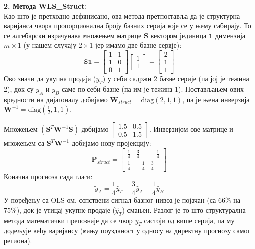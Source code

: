 \documentclass[12pt,oneside]{memoir}
\begin{document}
\vspace{0.5em}
\noindent \textbf{2. Метода WLS\_Struct:} \\
Као што је претходно дефинисано, ова метода претпоставља да је структурна варијанса чвора пропорционална броју базних серија које се у њему сабирају. То се алгебарски израчунава множењем матрице $\mathbf{S}$ вектором јединица $\mathbf{1}$ димензија $m \times 1$ (у нашем случају $2 \times 1$ јер имамо две базне серије):
\begin{equation}
    \mathbf{S}\mathbf{1} = 
    \begin{bmatrix} 1 & 1 \\ 1 & 0 \\ 0 & 1 \end{bmatrix} 
    \begin{bmatrix} 1 \\ 1 \end{bmatrix} = 
    \begin{bmatrix} 2 \\ 1 \\ 1 \end{bmatrix}
\end{equation}
Ово значи да укупна продаја ($y_T$) у себи садржи 2 базне серије (па јој је тежина 2), док су $y_A$ и $y_B$ саме по себи базне (па им је тежина 1). Постављањем ових вредности на дијагоналу добијамо $\mathbf{W}_{struct} = \text{diag}(2, 1, 1)$, па је њена инверзија $\mathbf{W}^{-1} = \text{diag}(\frac{1}{2}, 1, 1)$. 


Множењем $(\mathbf{S}^T \mathbf{W}^{-1} \mathbf{S})$ добијамо $\begin{bmatrix} 1.5 & 0.5 \\ 0.5 & 1.5 \end{bmatrix}$. Инверзијом ове матрице и множењем са $\mathbf{S}^T \mathbf{W}^{-1}$ добијамо нову пројекцију:
\begin{equation}
    \mathbf{P}_{struct} = 
    \begin{bmatrix} 
    \frac{1}{4} & \frac{3}{4} & -\frac{1}{4} \\ 
    \frac{1}{4} & -\frac{1}{4} & \frac{3}{4} 
    \end{bmatrix}
\end{equation}
Коначна прогноза сада гласи:
\begin{equation}
    \tilde{y}_A = \frac{1}{4}\hat{y}_T + \frac{3}{4}\hat{y}_A - \frac{1}{4}\hat{y}_B
\end{equation}
У поређењу са OLS-ом, сопствени сигнал базног нивоа је појачан (са $66\%$ на $75\%$), док је утицај укупне продаје ($\hat{y}_T$) смањен. Разлог је то што структурална метода математички препознаје да се чвор $y_T$ састоји од више серија, па му додељује већу варијансу (мању поузданост у односу на директну прогнозу самог региона).
\end{document}
